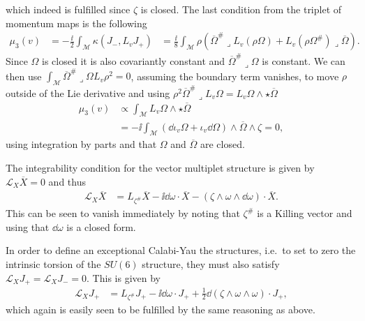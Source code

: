 which indeed is fulfilled since $\zeta$ is closed. The last condition from the triplet of momentum maps is the following 
\begin{equation}
    \begin{aligned}
    \mu_3(v) &= -\frac{\ii}{2}\int_\mathcal{M}\kappa(J_-,L_vJ_+)
             &= \frac{\ii}{8}\int_\mathcal{M}\rho \left(\overbar{\Omega}^{\#}\lrcorner L_v(\rho \Omega)+L_v(\rho\Omega^{\#})\lrcorner \overbar{\Omega}\right).
    \end{aligned}
\end{equation}
Since $\Omega$ is closed it is also covariantly constant and $\overbar{\Omega}^{\#}\lrcorner \Omega$ is constant. We can then use $\int_\mathcal{M}\overbar{\Omega}^{\#}\lrcorner \Omega L_v\rho^2=0$, assuming the boundary term vanishes, to move $\rho$ outside of the Lie derivative and using $\rho^2\overbar{\Omega}^{\#}\lrcorner L_v \Omega=L_v \Omega\wedge \star\overbar{\Omega}$ 
\begin{equation}
    \begin{aligned}
    \mu_3(v) &\propto \int_\mathcal{M}L_v\Omega\wedge\star\overbar{\Omega}\\
             &=-\ii\int_\mathcal{M}(\dd\iota_v\Omega+\iota_v\dd\Omega)\wedge\overbar{\Omega}\wedge\zeta=0,
    \end{aligned}
\end{equation}
using integration by parts and that $\Omega$ and $\overbar{\Omega}$ are closed. 
 
The integrability condition for the vector multiplet structure is given by $\mathscr{L}_X\overbar{X}=0$ and thus
\begin{equation}
    \begin{aligned}
    \mathscr{L}_X\overbar{X} &= L_{\zeta^{\#}}\overbar{X}-\ii\dd\omega\cdot \overbar{X}-(\zeta\wedge\omega\wedge\dd\omega)\cdot \overbar{X}.
    \end{aligned}
\end{equation}
This can be seen to vanish immediately by noting that $\zeta^{\#}$ is a Killing vector and using that $\dd\omega$ is a closed form. 

In order to define an exceptional Calabi-Yau the structures, i.e.\ to set to zero the intrinsic torsion of the $SU(6)$ structure, they must also satisfy $\mathscr{L}_XJ_+=\mathscr{L}_XJ_-=0$. This is given by 
\begin{equation}
    \begin{aligned}
    \mathscr{L}_X J_+ &= L_{\zeta^{\#}}J_+-\ii\dd\omega\cdot J_++\frac{1}{2}\dd(\zeta\wedge\omega\wedge\omega)\cdot J_+,
    \end{aligned}
\end{equation}
which again is easily seen to be fulfilled by the same reasoning as above. 

